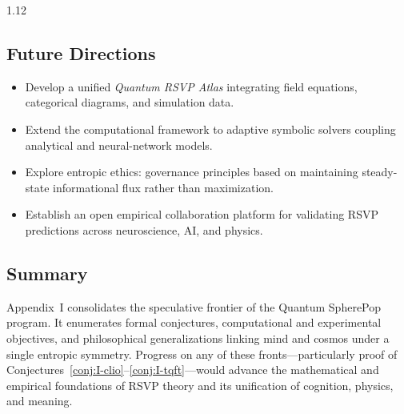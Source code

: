 \documentclass[12pt,a4paper]{article}
\numberwithin{equation}{section}
\theoremstyle{remark}
\theoremstyle{definition}
\begin{document}
\begin{spacing}{1.12}
\subsection{Future Directions}\label{sec:I-future}
\begin{itemize}
\item Develop a unified \emph{Quantum RSVP Atlas} integrating field equations, categorical diagrams, and simulation data.
\item Extend the computational framework to adaptive symbolic solvers coupling analytical and neural-network models.
\item Explore entropic ethics: governance principles based on maintaining steady-state informational flux rather than maximization.
\item Establish an open empirical collaboration platform for validating RSVP predictions across neuroscience, AI, and physics.
\end{itemize}

\begin{center}
\end{center}

\subsection{Summary}\label{sec:I-summary}
Appendix~I consolidates the speculative frontier of the Quantum SpherePop program.  
It enumerates formal conjectures, computational and experimental objectives, and philosophical generalizations linking mind and cosmos under a single entropic symmetry.  
Progress on any of these fronts—particularly proof of Conjectures~\ref{conj:I-clio}--\ref{conj:I-tqft}—would advance the mathematical and empirical foundations of RSVP theory and its unification of cognition, physics, and meaning.



\end{spacing}
\end{document}
